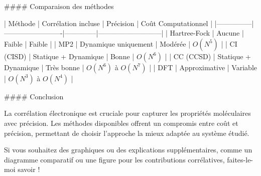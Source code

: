 \documentclass[12pt,a4paper]{report}
\begin{document}
\begin{markdown}
#### Comparaison des méthodes

| Méthode       | Corrélation incluse     | Précision    | Coût Computationnel       |
|---------------|-------------------------|--------------|---------------------------|
| Hartree-Fock  | Aucune                 | Faible       | Faible                    |
| MP2           | Dynamique uniquement   | Modérée      | \(O(N^5)\)                |
| CI (CISD)     | Statique + Dynamique   | Bonne        | \(O(N^6)\)                |
| CC (CCSD)     | Statique + Dynamique   | Très bonne   | \(O(N^6)\) à \(O(N^7)\)   |
| DFT           | Approximative          | Variable     | \(O(N^3)\) à \(O(N^4)\)   |

#### Conclusion

La corrélation électronique est cruciale pour capturer les propriétés moléculaires avec précision. Les méthodes disponibles offrent un compromis entre coût et précision, permettant de choisir l’approche la mieux adaptée au système étudié.

Si vous souhaitez des graphiques ou des explications supplémentaires, comme un diagramme comparatif ou une figure pour les contributions corrélatives, faites-le-moi savoir !

\end{markdown}
\end{document}
